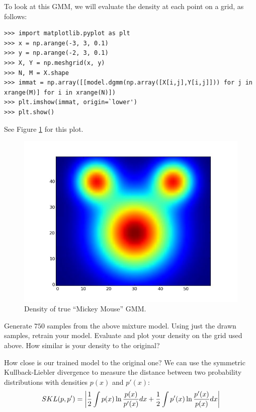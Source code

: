 To look at this GMM, we will evaluate the density at each point on a grid, as follows:
\begin{lstlisting}
>>> import matplotlib.pyplot as plt
>>> x = np.arange(-3, 3, 0.1)
>>> y = np.arange(-2, 3, 0.1)
>>> X, Y = np.meshgrid(x, y)
>>> N, M = X.shape
>>> immat = np.array([[model.dgmm(np.array([X[i,j],Y[i,j]])) for j in xrange(M)] for i in xrange(N)])
>>> plt.imshow(immat, origin=`lower')
>>> plt.show()
\end{lstlisting}

See Figure \ref{fig:mickeygmm} for this plot.
\begin{figure}[h]
\centering
\includegraphics[width=\textwidth]{truemickeygmm.jpeg}
\caption{Density of true ``Mickey Mouse'' GMM.}
\label{fig:mickeygmm}
\end{figure}

\begin{problem}
Generate $750$ samples from the above mixture model. Using just the drawn samples, retrain your model. Evaluate and plot your density on the grid used above. How similar is your density to the original?
\end{problem}

How close is our trained model to the original one? We can use the symmetric Kullback-Liebler divergence to measure the distance between two probability distributions with densities $p(x)$ and $p'(x)$:
\begin{equation*}
SKL(p,p') = \left\lvert\frac{1}{2} \int p(x) \ln \frac{p(x)}{p'(x)} dx + \frac{1}{2} \int p'(x) \ln \frac{p'(x)}{p(x)} dx\right\rvert
\end{equation*}

